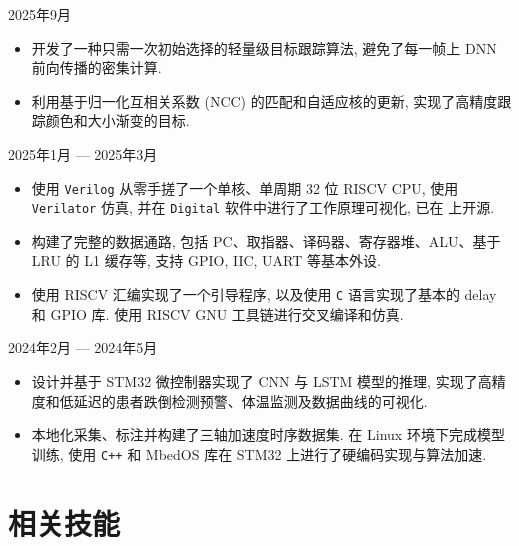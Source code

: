  \hfill 2025年9月

\begin{itemize}
    \setlength\itemsep{-0.5em}
    \setlength\topsep{0pt}
    \setlength\partopsep{0pt}
    \item 开发了一种只需一次初始选择的轻量级目标跟踪算法, 避免了每一帧上 DNN 前向传播的密集计算.
    \item 利用基于归一化互相关系数 (NCC) 的匹配和自适应核的更新, 实现了高精度跟踪颜色和大小渐变的目标.
\end{itemize}

 \hfill 2025年1月 --- 2025年3月

\begin{itemize}
    \setlength\itemsep{-0.5em}
    \setlength\topsep{0pt}
    \setlength\partopsep{0pt}
    \item 使用 \texttt{Verilog} 从零手搓了一个单核、单周期 32 位 RISCV CPU, 使用 \texttt{Verilator} 仿真, 并在 \texttt{Digital} 软件中进行了工作原理可视化, 已在  上开源.
    \item 构建了完整的数据通路, 包括 PC、取指器、译码器、寄存器堆、ALU、基于 LRU 的 L1 缓存等, 支持 GPIO, IIC, UART 等基本外设.
    \item 使用 RISCV 汇编实现了一个引导程序, 以及使用 \texttt{C} 语言实现了基本的 delay 和 GPIO 库. 使用 RISCV GNU 工具链进行交叉编译和仿真.
\end{itemize}

 \hfill 2024年2月 --- 2024年5月

\begin{itemize}
    \setlength\itemsep{-0.5em}
    \setlength\topsep{0pt}
    \setlength\partopsep{0pt}
    \item 设计并基于 STM32 微控制器实现了 CNN 与 LSTM 模型的推理, 实现了高精度和低延迟的患者跌倒检测预警、体温监测及数据曲线的可视化.
    \item 本地化采集、标注并构建了三轴加速度时序数据集. 在 Linux 环境下完成模型训练, 使用 \texttt{C++} 和 MbedOS 库在 STM32 上进行了硬编码实现与算法加速.
\end{itemize}


\section{相关技能}


